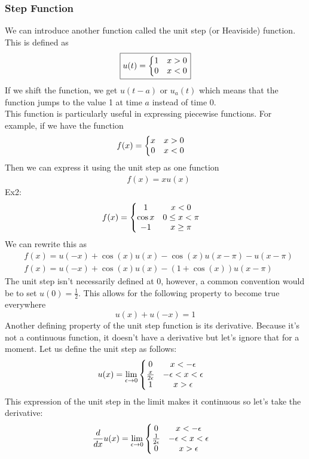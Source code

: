 \documentclass[11pt, fleqn]{article}
\begin{document}
\subsubsection{Step Function}
We can introduce another function called the unit step (or Heaviside) function. This is defined as
$$\boxed{u(t)=\left\{\begin{matrix} 1 & x>0\\ 0 & x<0 \end{matrix}\right.}$$
If we shift the function, we get $u(t-a)$ or $u_a(t)$ which means that the function jumps to the value 1 at time $a$ instead of time 0.\\
This function is particularly useful in expressing piecewise functions. For example, if we have the function
\begin{align*}
    &f(x)=\left\{\begin{matrix} x & x>0\\ 0 & x<0 \end{matrix}\right.
\end{align*}
Then we can express it using the unit step as one function
\begin{align*}
    &f(x)=xu(x)
\end{align*}
Ex2:
\begin{align*}
    &f(x)=\left\{\begin{matrix} 1 & x<0\\ \cos x & 0\leq x< \pi\\ -1 & x\geq \pi \end{matrix}\right.
\end{align*}
We can rewrite this as
\begin{align*}
    &f(x)=u(-x)+\cos(x)u(x)-\cos(x)u(x-\pi)-u(x-\pi)\\
    &f(x)=u(-x)+\cos(x)u(x)-(1+\cos(x))u(x-\pi)
\end{align*}
The unit step isn't necessarily defined at 0, however, a common convention would be to set $u(0)=\frac{1}{2}$. This allows for the following property to become true everywhere
$$u(x)+u(-x)=1$$
Another defining property of the unit step function is its derivative. Because it's not a continuous function, it doesn't have a derivative but let's ignore that for a moment. Let us define the unit step as follows:
\begin{align*}
    &u(x)=\lim_{\epsilon\to0}\left\{\begin{matrix} 0 & x<-\epsilon\\ \frac{x}{2\epsilon} & -\epsilon<x<\epsilon\\ 1 & x>\epsilon \end{matrix}\right.
\end{align*}
This expression of the unit step in the limit makes it continuous so let's take the derivative:
\begin{align*}
    &\frac{d }{d x}u(x)=\lim_{\epsilon\to0}\left\{\begin{matrix} 0 & x<-\epsilon\\ \frac{1}{2\epsilon} & -\epsilon< x<\epsilon\\ 0 & x>\epsilon \end{matrix}\right.
\end{align*}
\end{document}
